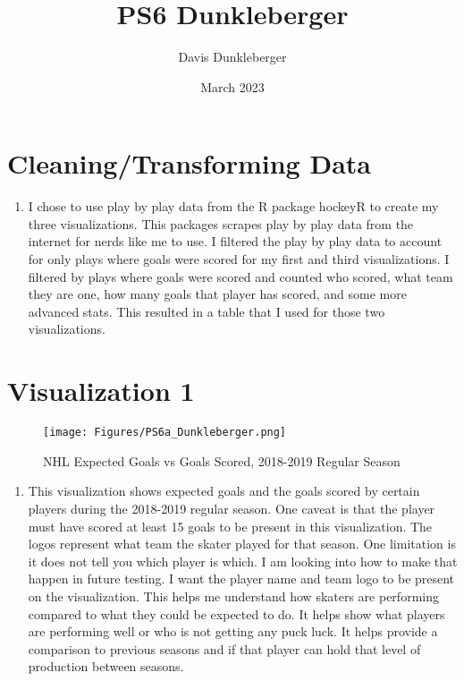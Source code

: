 \documentclass{article}
\title{PS6 Dunkleberger}
\author{Davis Dunkleberger}
\date{March 2023}
\begin{document}
\maketitle

\section{Cleaning/Transforming Data}
\begin{enumerate}
    \item I chose to use play by play data from the R package hockeyR to create my three visualizations. This packages scrapes play by play data from the internet for nerds like me to use. I filtered the play by play data to account for only plays where goals were scored for my first and third visualizations. I filtered by plays where goals were scored and counted who scored, what team they are one, how many goals that player has scored, and some more advanced stats. This resulted in a table that I used for those two visualizations. 
\end{enumerate}
\section{Visualization 1}

\begin{figure}[h]
    \centering
    \texttt{[image: Figures/PS6a\_Dunkleberger.png]}
    \caption{NHL Expected Goals vs Goals Scored, 2018-2019 Regular Season}
    \label{fig:NHL 18-19 EG vs GS}
\end{figure}

\begin{enumerate}
    \item This visualization shows expected goals and the goals scored by certain players during the 2018-2019 regular season. One caveat is that the player must have scored at least 15 goals to be present in this visualization. The logos represent what team the skater played for that season. One limitation is it does not tell you which player is which. I am looking into how to make that happen in future testing. I want the player name and team logo to be present on the visualization. This helps me understand how skaters are performing compared to what they could be expected to do. It helps show what players are performing well or who is not getting any puck luck. It helps provide a comparison to previous seasons and if that player can hold that level of production between seasons. 
\end{enumerate}
\end{document}
